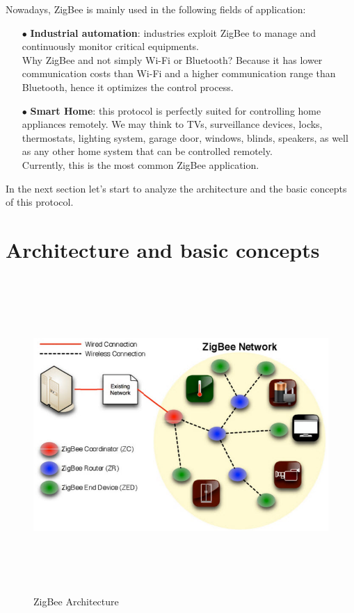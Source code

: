 \documentclass[12pt]{report}
\begin{document}
{Nowadays, ZigBee is mainly used in the following fields of application:
\begin{itemize}
\setlength{\itemindent}{+4mm}
\item[$\bullet$] \textbf{Industrial automation}: industries exploit ZigBee to manage and continuously monitor critical equipments.\\
Why ZigBee and not simply Wi-Fi or Bluetooth? Because it has lower communication costs than Wi-Fi and a higher communication range than Bluetooth, hence it optimizes the control process.
\item[$\bullet$] \textbf{Smart Home}: this protocol is perfectly suited for controlling home appliances remotely. We may think to TVs, surveillance devices, locks, thermostats, lighting system, garage door, windows, blinds, speakers, as well as any other home system that can be controlled remotely.\\
Currently, this is the most common ZigBee application.\\

\end{itemize}

In the next section let's start to analyze the architecture and the basic concepts of this protocol.\\

\section{Architecture and basic concepts}
\bigskip

\begin{figure}[H]
\includegraphics[width=12cm,height=12cm,keepaspectratio]{zigbee_architecture}
\centering
\caption{ZigBee Architecture}
\end{figure}

}
\end{document}
